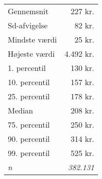 \begin{tabular}{lr}
\toprule
Gennemsnit &                  227 kr.  \\
Sd-afvigelse &                     82 kr.  \\
\midrule
Mindste værdi &                     25 kr.  \\
Højeste værdi &               4.492 kr.  \\
\midrule
1. percentil &                  130 kr.  \\
10. percentil &                  157 kr.  \\
25. percentil &                  178 kr.  \\
Median &                  208 kr.  \\
75. percentil &                  250 kr.  \\
90. percentil &                  314 kr.  \\
99. percentil &                  525 kr.  \\
\midrule
\textit{n} & \textit{382.131} \\
\bottomrule
\end{tabular}%
